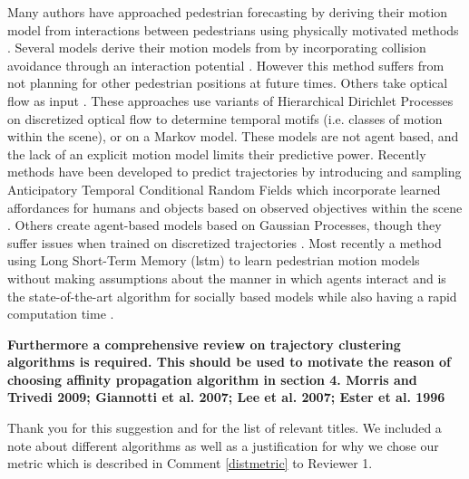 \documentclass[usenames,dvipsnames]{article}
\newcommand{\Ram}[1]{{\normalsize{\textbf{({\color{green}Ram:\ }#1)}}}}
\providecommand{\response}[1]{
\noindent
\noindent\colorbox{gray!20}{
\parbox{\textwidth}{
\setlength{\parskip}{.1in}
\setlength{\parindent}{.1in}
#1}
}
}
\begin{document}
\begin{enumerate}
\reversemarginpar{}
	\response{Many authors have approached pedestrian forecasting by deriving their motion model from interactions between pedestrians using physically motivated methods \cite{Helbing1995,Xu2012}. 
	Several models derive their motion models from \cite{Helbing1995} by incorporating collision avoidance through an interaction potential \cite{Pellegrini2009,Yamaguchi2011,Yi2016}. 
	However this method suffers from not planning for other pedestrian positions at future times. 
	Others take optical flow as input \cite{Hospedales2009,Wang2009,Emonet2011}.
	These approaches use variants of Hierarchical Dirichlet Processes on discretized optical flow to determine temporal motifs (i.e. classes of motion within the scene), or on a Markov model. 
	 These models are not agent based, and the lack of an explicit motion model limits their predictive power. 
	 Recently methods have been developed to predict trajectories by introducing and sampling Anticipatory Temporal Conditional Random Fields which incorporate learned affordances for humans and objects based on observed objectives within the scene \cite{Koppula2016}. 
	 Others create agent-based models based on Gaussian Processes, though they suffer issues when trained on discretized trajectories \cite{Tay2008,Wang2008,Trautman2015}. 
	Most recently a method using Long Short-Term Memory (lstm) to learn pedestrian motion models without making assumptions about the manner in which agents interact and is the state-of-the-art algorithm for socially based models while also having a rapid computation time \cite{Alahi2016}.}

\begin{item}
\textbf{Furthermore a comprehensive review on trajectory clustering algorithms
is required. This should be used to motivate the reason of choosing
affinity propagation algorithm in section 4. 
Morris and Trivedi 2009; Giannotti et al. 2007; Lee et al. 2007;
Ester et al. 1996 }

Thank you for this suggestion and for the list of relevant titles.
 We included a note about different algorithms as well as a justification for why we chose our metric which is described in Comment \ref{distmetric} to Reviewer 1. 

\end{item}
\end{enumerate}
\end{document}
